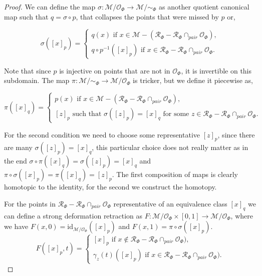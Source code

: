 \documentclass[10pt]{article} %
\theoremstyle{plain}
\theoremstyle{definition}
\theoremstyle{remark}
\begin{document}
\begin{proof}
    We can define the map $\sigma: \mathcal{M}/\mathcal{O}_\Phi \to \mathcal{M}/\sim_\Phi$ as another quotient canonical map such that $q = \sigma \circ p$, that collapses the points that were missed by $p$ or,
    
    \begin{equation*}
        \sigma([x]_p) = 
        \begin{cases}
            q(x) \text{ if } x \in \mathcal{M} - (\mathcal{R}_\Phi-\mathcal{R}_\Phi\cap_{pair}\mathcal{O}_\Phi), \\
            q \circ p^{-1}([x]_p) \text{ if } x \in \mathcal{R}_\Phi-\mathcal{R}_\Phi\cap_{pair}\mathcal{O}_\Phi.
        \end{cases}
    \end{equation*}
    
    Note that since $p$ is injective on points that are not in $\mathcal{O}_\Phi$, it is invertible on this subdomain. The map $\pi: \mathcal{M}/\sim_\Phi \to \mathcal{M}/\mathcal{O}_\Phi$ is tricker, but we define it piecewise as,

    \begin{equation*}
    \pi([x]_q) = 
        \begin{cases}
            p(x) \text{ if } x \in \mathcal{M} - (\mathcal{R}_\Phi-\mathcal{R}_\Phi\cap_{pair}\mathcal{O}_\Phi), \\
            [z]_p \text{ such that } \sigma([z]_p) = [x]_q \text{ for some } z \in \mathcal{R}_\Phi - \mathcal{R}_\Phi\cap_{pair}\mathcal{O}_\Phi.
        \end{cases}
    \end{equation*}

    For the second condition we need to choose some representative $[z]_p$, since there are many $\sigma([z]_p) = [x]_q$, this particular choice does not really matter as in the end $\sigma \circ \pi ([x]_q) = \sigma([z]_p) = [x]_q$ and $\pi \circ \sigma([x]_p) = \pi([x]_q) =  [z]_p$. The first composition of maps is clearly homotopic to the identity, for the second we construct the homotopy.

    For the points in $\mathcal{R}_\Phi- \mathcal{R}_\Phi\cap_{pair}\mathcal{O}_\Phi$ representative of an equivalence class $[x]_q$ we can define a strong deformation retraction as $F:\mathcal{M}/\mathcal{O}_\Phi\times [0,1] \to \mathcal{M}/\mathcal{O}_\Phi$, where we have $F(x,0) = \text{id}_{\mathcal{M}/\mathcal{O}_\Phi}([x]_p)$ and $F(x,1) = \pi \circ \sigma ([x]_p)$. 
    \begin{equation*}
        F([x]_p,t) = 
        \begin{cases}
            [x]_p \text{ if } x\notin \mathcal{R}_\Phi- \mathcal{R}_\Phi\cap_{pair}\mathcal{O}_\Phi),\\
            \gamma_z(t)([x]_p) \text{ if } x \in \mathcal{R}_\Phi- \mathcal{R}_\Phi\cap_{pair}\mathcal{O}_\Phi).
        \end{cases}
    \end{equation*}


\end{proof}
\end{document}
